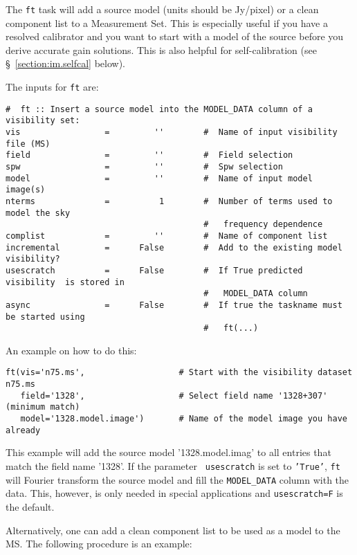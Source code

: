 The {\tt ft} task will add a source model (units should be Jy/pixel)
or a clean component list
to a Measurement Set.  This is especially useful if
you have a resolved calibrator and you want to start with a model of
the source before you derive accurate gain solutions.  This is also
helpful for self-calibration (see \S~\ref{section:im.selfcal} below).

The inputs for {\tt ft} are:
\small
\begin{verbatim}
#  ft :: Insert a source model into the MODEL_DATA column of a visibility set:
vis                 =         ''        #  Name of input visibility file (MS)
field               =         ''        #  Field selection
spw                 =         ''        #  Spw selection
model               =         ''        #  Name of input model image(s)
nterms              =          1        #  Number of terms used to model the sky
                                        #   frequency dependence
complist            =         ''        #  Name of component list
incremental         =      False        #  Add to the existing model visibility?
usescratch          =      False        #  If True predicted  visibility  is stored in
                                        #   MODEL_DATA column
async               =      False        #  If true the taskname must be started using
                                        #   ft(...)
\end{verbatim}
\normalsize

An example on how to do this: 
\small
\begin{verbatim}
ft(vis='n75.ms',                   # Start with the visibility dataset n75.ms
   field='1328',                   # Select field name '1328+307' (minimum match) 
   model='1328.model.image')       # Name of the model image you have already
\end{verbatim}
\normalsize
This example will add the source model '1328.model.imag' to all
entries that match the field name '1328'. If the parameter {\tt
  usescratch} is set to {\tt 'True'}, {\tt ft} will Fourier transform the
source model and fill the {\tt MODEL\_DATA} column with the data. This,
however, is only needed in special applications and {\tt usescratch=F}
is the default.

Alternatively, one can add a clean component list to be used as a
model to the MS. The following procedure is an example:

